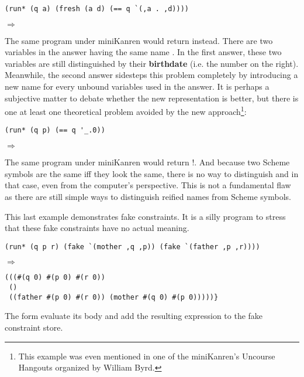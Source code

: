 \begin{lstlisting}
(run* (q a) (fresh (a d) (== q `(,a . ,d))))
\end{lstlisting}
$\Rightarrow$ 

The same program under miniKanren would return  instead. There are two variables in the answer having the same name . In the first answer, these two variables are still distinguished by their \textbf{birthdate} (i.e. the number on the right). Meanwhile, the second answer sidesteps this problem completely by introducing a new name for every unbound variables used in the answer. It is perhaps a subjective matter to debate whether the new representation is better, but there is one at least one theoretical problem avoided by the new approach\footnote{This example was even mentioned in one of the miniKanren's Uncourse Hangouts organized by William Byrd.}:

\begin{lstlisting}
(run* (q p) (== q '_.0))
\end{lstlisting}
$\Rightarrow$ 

The same program under miniKanren would return !. And because two Scheme symbols are the same iff they look the same, there is no way to distinguish  and  in that case, even from the computer's perspective. This is not a fundamental flaw as there are still simple ways to distinguish reified names from Scheme symbols.

This last example demonstrates fake constraints. It is a silly program to stress that these fake constraints have no actual meaning.
\begin{lstlisting}
(run* (q p r) (fake `(mother ,q ,p)) (fake `(father ,p ,r))))
\end{lstlisting}

$\Rightarrow$
\begin{lstlisting}
(((#(q 0) #(p 0) #(r 0))
 ()
 ((father #(p 0) #(r 0)) (mother #(q 0) #(p 0)))))}
\end{lstlisting}

The  form evaluate its body and add the resulting expression to the fake constraint store.

